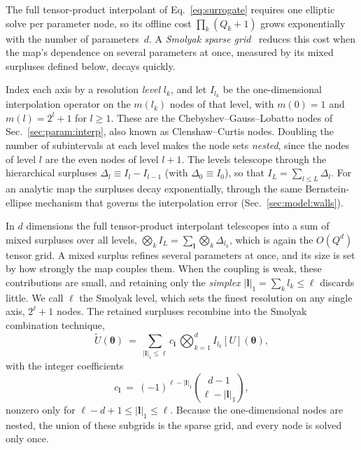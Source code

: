 \documentclass[
  aps,
  prd,
  twocolumn,
  10pt,
  amsmath,
  amssymb,
  nofootinbib,
  superscriptaddress,
  floatfix,
]{revtex4-2}
\newcommand{\vect}[1]{\boldsymbol{#1}}
\begin{document}
The full tensor-product interpolant of Eq.~\eqref{eq:surrogate} requires one
elliptic solve per parameter node, so its off\-line cost $\prod_k(Q_k{+}1)$
grows exponentially with the number of parameters~$d$.
A \emph{Smolyak sparse grid}~\cite{Smolyak1963,NobileTemponeWebster2008} reduces this cost when the map's dependence on several parameters at once, measured by its mixed surpluses defined below, decays quickly.

Index each axis by a resolution \emph{level} $l_k$, and let $I_{l_k}$ be the
one-dimensional interpolation operator on the $m(l_k)$ nodes of that level, with
$m(0)=1$ and $m(l)=2^{l}+1$ for $l\ge1$.
These are the Chebyshev--Gauss--Lobatto nodes of Sec.~\ref{sec:param:interp}, also known as Clenshaw--Curtis nodes.
Doubling the number of subintervals at each level makes the node sets \emph{nested}, since the nodes of level $l$ are the even nodes of level $l{+}1$.
The
levels telescope through the hierarchical surpluses
$\Delta_{l}\equiv I_{l}-I_{l-1}$ (with $\Delta_0\equiv I_0$), so that
$I_{L}=\sum_{l\le L}\Delta_{l}$. For an analytic map the surpluses decay
exponentially, through the same Bernstein-ellipse mechanism that governs the
interpolation error (Sec.~\ref{sec:model:walls}).

In $d$ dimensions the full tensor-product interpolant telescopes into a sum of mixed surpluses over all
levels, $\bigotimes_k I_{L}=\sum_{\vect{l}}\bigotimes_k\Delta_{l_k}$, which is again
the $O(Q^d)$ tensor grid.
A mixed surplus refines several parameters at once, and its size is set by how strongly the map couples them.
When the coupling is weak, these contributions are small, and retaining only the \emph{simplex} $|\vect{l}|_1=\sum_k l_k\le\ell$ discards little.
We call $\ell$ the Smolyak level, which sets the finest resolution on any single axis, $2^{\ell}+1$ nodes.
The retained surpluses recombine
into the Smolyak combination technique,
\begin{equation}
  \tilde U(\vect{\theta}) \ = \ \sum_{|\vect{l}|_1 \le \ell} c_{\vect{l}}\,
  \bigotimes_{k=1}^{d} I_{l_k}[U](\vect{\theta}),
  \label{eq:smolyak}
\end{equation}
with the integer coefficients
\begin{equation}
  c_{\vect{l}} \ = \ (-1)^{\ell-|\vect{l}|_1}\binom{d-1}{\ell-|\vect{l}|_1},
  \label{eq:smolyak-coef}
\end{equation}
nonzero only for $\ell-d+1\le|\vect{l}|_1\le\ell$. Because the one-dimensional
nodes are nested, the union of these subgrids is the sparse grid, and every node is
solved only once.
\end{document}
